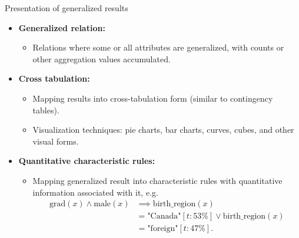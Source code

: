 \documentclass[aspectratio=169,t]{beamer}
\begin{document}
  { 
    \begin{frame}{Presentation of generalized results}
    \begin{itemize}
      \item \textbf{Generalized relation:}
      \begin{itemize}
        \item Relations where some or all attributes are generalized, with counts or other aggregation values accumulated.
      \end{itemize}
      \item \textbf{Cross tabulation:}
      \begin{itemize}
        \item Mapping results into cross-tabulation form (similar to contingency tables).
        \item Visualization techniques: pie charts, bar charts, curves, cubes, and other visual forms.
      \end{itemize}
      \item \textbf{Quantitative characteristic rules:}
      \begin{itemize}
        \item Mapping generalized result into characteristic rules with quantitative information associated with it, e.g.
        \begin{align}
        \text{grad}(x) \wedge \text{male}(x) &\implies \text{birth\_region}(x) \\
        &= \text{"Canada"}[t:53\%] \lor \text{birth\_region}(x) \\
        &= \text{"foreign"}[t:47\%].
        \end{align}
      \end{itemize}
    \end{itemize}
    \end{frame}
  }
\end{document}
